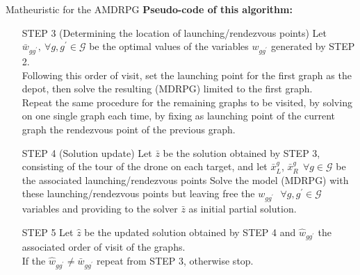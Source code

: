 \documentclass[slidestop,usepdftitle=false,10pt]{beamer}
\begin{document}
    \begin{frame}{Matheuristic for the AMDRPG}
    \textbf{Pseudo-code of this algorithm:}
    \begin{itemize}
        \small
            \item[STEP 3] (Determining the location of launching/rendezvous points)
            Let $\bar{w}_{gg^{'}}, \: \forall g,g^{'} \in \mathcal G$ be the optimal values of the variables $w_{gg^{'}}$ generated by STEP 2.\\
            Following this order of visit, set the launching point for the first graph as the depot, then solve the resulting (MDRPG) limited to the first graph.\\
            Repeat the same procedure for the remaining graphs to be visited, by solving \AMD\xspace on one single graph each time, by fixing as launching point of the current graph the rendezvous point of the previous graph.
            
            \item [STEP 4] (Solution update) 
            Let $\bar{z}$ be the solution obtained by STEP 3, consisting of the tour of the drone on each target,  %
            and let $\bar{x}_{L}^{g}$, $\bar{x}_{R}^{g} \:\: \forall g \in \mathcal G$ be the associated launching/rendezvous points %
            Solve the model (MDRPG) with these launching/rendezvous points but leaving free the $w_{gg^{'}} \:\:\ \forall g,g^{'} \in \mathcal G$ variables and providing to the solver $\bar{z}$ as initial partial solution.
            \item [STEP 5]
            Let $\hat{z}$ be the updated solution obtained by STEP 4 %
            and $\hat{w}_{gg^{'}}$ the associated order of visit of the graphs.\\
            If the $\hat{w}_{gg^{'}} \neq \bar{w}_{gg^{'}}$ repeat from STEP 3, otherwise stop.
            \end{itemize}
	\end{frame}
\end{document}
